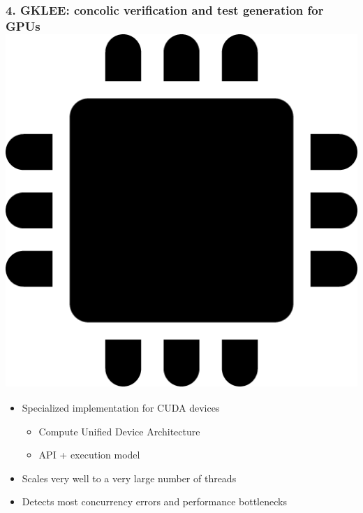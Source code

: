 \documentclass{beamer}
\begin{document}
	\begin{frame}
		\frametitle{4. GKLEE: concolic verification and test generation for GPUs \cite{base7} \includegraphics[scale=0.025]{gpu}}
		
		\begin{itemize}
			\item Specialized implementation for CUDA devices
			\begin{itemize}
				\item Compute Unified Device Architecture
				\item API + execution model
			\end{itemize}
			\item Scales very well to a very large number of threads
			\item Detects most concurrency errors and performance bottlenecks
		\end{itemize}
	\end{frame}
	
\end{document}
